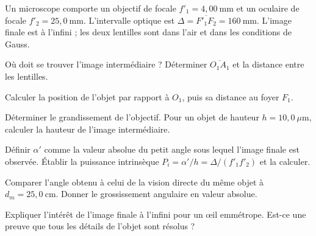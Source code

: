 \label{ch01-ex-D3}
Un microscope comporte un objectif de focale $f'_1=4{,}00\ \mathrm{mm}$ et un oculaire de focale $f'_2=25{,}0\ \mathrm{mm}$. L'intervalle optique est $\Delta=\overline{F'_1F_2}=160\ \mathrm{mm}$. L'image finale est à l'infini ; les deux lentilles sont dans l'air et dans les conditions de Gauss.
\begin{questions}
\item Où doit se trouver l'image intermédiaire ? Déterminer $\overline{O_1A_1}$ et la distance entre les lentilles.
\item Calculer la position de l'objet par rapport à $O_1$, puis sa distance au foyer $F_1$.
\item Déterminer le grandissement de l'objectif. Pour un objet de hauteur $h=10{,}0\ \mu\mathrm{m}$, calculer la hauteur de l'image intermédiaire.
\item Définir $\alpha'$ comme la valeur absolue du petit angle sous lequel l'image finale est observée. Établir la puissance intrinsèque $P_i=\alpha'/h=\Delta/(f'_1f'_2)$ et la calculer.
\item Comparer l'angle obtenu à celui de la vision directe du même objet à $d_m=25{,}0\ \mathrm{cm}$. Donner le grossissement angulaire en valeur absolue.
\item Expliquer l'intérêt de l'image finale à l'infini pour un œil emmétrope. Est-ce une preuve que tous les détails de l'objet sont résolus ?
\end{questions}

